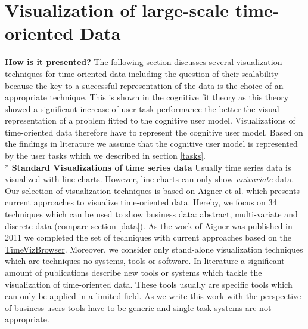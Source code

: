 \section{Visualization of large-scale time-oriented Data} \label{vis}
\textbf{How is it presented?}
The following section discusses several visualization techniques for time-oriented data including the question of their scalability because the key to a successful representation of the data is the choice of an appropriate technique. This is shown in the cognitive fit theory\cite{Vessey1991} as this theory showed a significant increase of user task performance the better the visual representation of a problem fitted to the cognitive user model. Visualizations of time-oriented data therefore have to represent the cognitive user model. Based on the findings in literature we assume that the cognitive user model is represented by the user tasks which we described in section \ref{tasks}.\\* 
\textbf{Standard Visualizations of time series data}
Usually time series data is visualized with line charts. However, line charts can only show \textit{univariate} data. Our selection of visualization techniques is based on Aigner et al.\cite{Aigner2011} which presents current approaches to visualize time-oriented data. Hereby, we focus on 34 techniques which can be used to show business data: abstract, multi-variate and discrete data (compare section \ref{data}). 
As the work of Aigner was published in 2011 we completed the set of techniques with current approaches based on the \href{http://survey.timeviz.net/}{TimeVizBrowser}. Moreover, we consider only stand-alone visualization techniques which are techniques no systems, tools or software. In literature a significant amount of publications describe new tools or systems which tackle the visualization of time-oriented data. These tools usually are specific tools which can only be applied in a limited field. As we write this work with the perspective of business users tools have to be generic and single-task systems are not appropriate.

